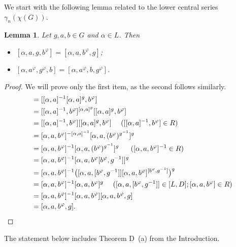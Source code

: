 \documentclass[12pt,leqno]{amsart}
\newtheorem{lem}[theorem]{\sc Lemma}
\begin{document}
We start with the following lemma  related to the lower central series $\gamma_n(\chi(G))$. 

\begin{lem}\label{Lm:Rcontas} Let $ g,a,b \in G$ and $\alpha\in L$. Then 
  \begin{itemize}
      \item[(i)]$[\alpha,a,g,b^{\varphi}]=[\alpha,a,b^{\varphi},g]$;
      \item[(ii)]$[\alpha,a^{\varphi},g^{\varphi},b]=[\alpha,a^{\varphi},b,g^{\varphi}].$ 
  \end{itemize}
\end{lem}
\begin{proof} 
We will prove only the first item, as the second follows similarly.
     \begin{align*}
        [\alpha,a,g,b^{\varphi}]
        &= [[\alpha,a]^{-1}[\alpha,a]^{g},b^{\varphi}]\\
        &= [[\alpha,a]^{-1},b^{\varphi}]^{[\alpha,a]^{g}}[[\alpha,a]^{g},b^{\varphi}]\\
        &= [[\alpha,a]^{-1},b^{\varphi}][[\alpha,a]^{g},b^{\varphi}] \ \ \ \ ([[\alpha,a]^{-1},b^{\varphi}]\in R)\\
        &= [\alpha,a,b^{\varphi}]^{-[\alpha,a]^{-1}}[\alpha,a,(b^{\varphi})^{g^{-1}}]^{g}\\
        &= [\alpha,a,b^{\varphi}]^{-1}[\alpha,a,(b^{\varphi})^{g^{-1}}]^{g} \ \ \ \ \ ([\alpha,a,b^{\varphi}]^{-1}\in R )\\
        &= [\alpha,a,b^{\varphi}]^{-1}[\alpha,a,b^{\varphi}[b^{\varphi},{g^{-1}}]]^{g}\\
        &= [\alpha,a,b^{\varphi}]^{-1}\big([\alpha,a,[b^{\varphi},{g^{-1}}]][\alpha,a,b^{\varphi}]^{[b^{\varphi},{g^{-1}}]}\big)^{g}\\
        &=[\alpha,a,b^{\varphi}]^{-1}[\alpha,a,b^{\varphi}]^{g} \ \ \ \ ([\alpha,a,[b^{\varphi},{g^{-1}}]]\in [L,D]; [\alpha,a,b^{\varphi}]\in R)\\
        &=[\alpha,a,b^{\varphi}]^{-1}[\alpha,a,b^{\varphi}][\alpha,a,b^{\varphi},g]\\
        &=[\alpha,a,b^{\varphi},g]. \qedhere
    \end{align*}
\end{proof}

The statement below includes Theorem D~(a) from the Introduction. 
\end{document}
